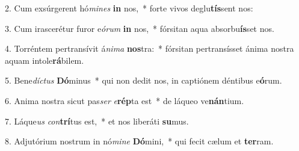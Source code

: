 2. Cum exsúrgerent hó\textit{mi}\textit{nes} \textbf{in} nos,~*  forte vivos deglu\textbf{tís}sent nos:\

3. Cum irascerétur furor e\textit{ó}\textit{rum} \textbf{in} nos,~*  fórsitan aqua absorbu\textbf{ís}set nos.\

4. Torréntem pertransívit á\textit{ni}\textit{ma} \textbf{nos}tra:~*  fórsitan pertransísset ánima nostra aquam intole\textbf{rá}bilem.\

5. Bene\textit{díc}\textit{tus} \textbf{Dó}minus~*  qui non dedit nos, in captiónem déntibus e\textbf{ó}rum.\

6. Anima nostra sicut pas\textit{ser} \textit{e}\textbf{rép}ta est~*  de láqueo ve\textbf{nán}tium.\

7. Láque\textit{us} \textit{con}\textbf{trí}tus est,~*  et nos liberáti \textbf{su}mus.\

8. Adjutórium nostrum in nó\textit{mi}\textit{ne} \textbf{Dó}mini,~*  qui fecit cælum et \textbf{ter}ram.\

